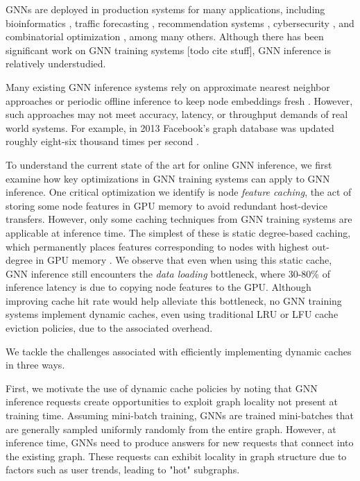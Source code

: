 GNNs are deployed in production systems for many applications, including bioinformatics \cite{Bioinfo_2021} \cite{Bioinfo_2022}, 
traffic forecasting \cite{Traffic_SST-GNN_2021} \cite{Traffic_GoogleMaps_2021} \cite{Traffic_survey_2021}, recommendation systems \cite{Recsys_PinSAGE_2018} \cite{Recsys_Diffnet_2022}\cite{Recsys_LightGCN_2020}\cite{Recsys_NAGCN_2020}\cite{Recsys_SGL_2021}\cite{Recsys_Survey_2022}, 
cybersecurity \cite{Cybersec_2022} \cite{Cybersec_2023}, and combinatorial optimization \cite{CombinatorialOptimization_2019}\cite{CombinatorialOptimization_2021}, among many others. Although there has been significant work on GNN training systems [todo cite stuff], GNN inference is relatively understudied. 

Many existing GNN inference systems rely on approximate nearest neighbor approaches or periodic offline inference to keep node embeddings fresh \cite{Recsys_PinSAGE_2018} \cite{Recsys_Survey_2022}. However, such approaches may not meet accuracy, latency, or throughput demands of real world systems. For example, in 2013 Facebook's graph database was updated roughly eight-six thousand times per second \cite{Graph_Survey_2020}.

To understand the current state of the art for online GNN inference, we first examine how key optimizations in GNN training systems can apply to GNN inference. One critical optimization we identify is node \textit{feature caching}, the act of storing some node features in GPU memory to avoid redundant host-device transfers.
However, only some caching techniques from GNN training systems are applicable at inference time.
The simplest of these is static degree-based caching, which permanently places features corresponding to nodes with highest out-degree in GPU memory \cite{PaGraph_2020}.
We observe that even when using this static cache, GNN inference still encounters the \textit{data loading} bottleneck, where 30-80\% of inference latency is due to copying node features to the GPU.
Although improving cache hit rate would help alleviate this bottleneck, no GNN training systems implement dynamic caches, even using traditional LRU or LFU cache eviction policies, due to the associated overhead.

We tackle the challenges associated with efficiently implementing dynamic caches in three ways.

First, we motivate the use of dynamic cache policies by noting that GNN inference requests create opportunities to exploit graph locality not present at training time. Assuming mini-batch training, GNNs are trained mini-batches that are generally sampled uniformly randomly from the entire graph. However, at inference time, GNNs need to produce answers for new requests that connect into the existing graph. These requests can exhibit locality in graph structure due to factors such as user trends, leading to "hot" subgraphs.

